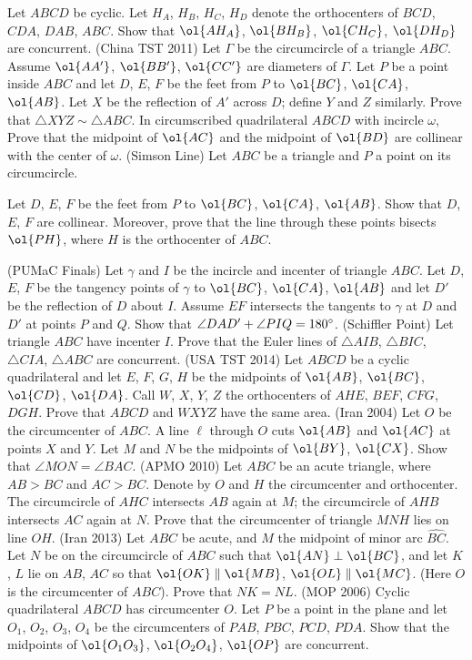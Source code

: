 \documentclass[11pt]{scrartcl}
\begin{document}
\begin{enumerate}
  \ii Let $ABCD$ be cyclic.
  Let $H_A$, $H_B$, $H_C$, $H_D$ denote the orthocenters of $BCD$, $CDA$, $DAB$, $ABC$.
  Show that $\ol{AH_A}$, $\ol{BH_B}$, $\ol{CH_C}$, $\ol{DH_D}$ are concurrent.
  \ii (China TST 2011)
  Let $\Gamma$ be the circumcircle of a triangle $ABC$.
  Assume $\ol{AA'}$, $\ol{BB'}$, $\ol{CC'}$ are diameters of $\Gamma$.
  Let $P$ be a point inside $ABC$ and let $D$, $E$, $F$ be the feet from $P$ to $\ol{BC}$, $\ol{CA}$, $\ol{AB}$.
  Let $X$ be the reflection of $A'$ across $D$; define $Y$ and $Z$ similarly.
  Prove that $\triangle XYZ \sim \triangle ABC$.
  \ii In circumscribed quadrilateral $ABCD$ with incircle $\omega$,
  Prove that the midpoint of $\ol{AC}$ and the midpoint of $\ol{BD}$ are collinear with the center of $\omega$.
  \ii (Simson Line) Let $ABC$ be a triangle and $P$ a point on its circumcircle.
  \begin{enumerate}[(a)]
    \ii Let $D$, $E$, $F$ be the feet from $P$ to $\ol{BC}$, $\ol{CA}$, $\ol{AB}$.
    Show that $D$, $E$, $F$ are collinear.
    \ii Moreover, prove that the line through these points bisects $\ol{PH}$,
    where $H$ is the orthocenter of $ABC$.
  \end{enumerate}
  \ii (PUMaC Finals) Let $\gamma$ and $I$ be the incircle and incenter of triangle $ABC$.
  Let $D$, $E$, $F$ be the tangency points of $\gamma$ to $\ol{BC}$, $\ol{CA}$, $\ol{AB}$
  and let $D'$ be the reflection of $D$ about $I$.
  Assume $EF$ intersects the tangents to $\gamma$ at $D$ and $D'$ at points $P$ and $Q$.
  Show that $\angle DAD' + \angle PIQ = 180^\circ$.
  \ii (Schiffler Point) Let triangle $ABC$ have incenter $I$.
  Prove that the Euler lines of $\triangle AIB$, $\triangle BIC$, $\triangle CIA$, $\triangle ABC$ are concurrent.
  \ii (USA TST 2014) Let $ABCD$ be a cyclic quadrilateral and let
  $E$, $F$, $G$, $H$ be the midpoints of $\ol{AB}$, $\ol{BC}$, $\ol{CD}$, $\ol{DA}$.
  Call $W$, $X$, $Y$, $Z$ the orthocenters of $AHE$, $BEF$, $CFG$, $DGH$.
  Prove that $ABCD$ and $WXYZ$ have the same area.
  \ii (Iran 2004) Let $O$ be the circumcenter of $ABC$.
  A line $\ell$ through $O$ cuts $\ol{AB}$ and $\ol{AC}$ at points $X$ and $Y$.
  Let $M$ and $N$ be the midpoints of $\ol{BY}$, $\ol{CX}$. Show that $\angle MON = \angle BAC$.
  \ii (APMO 2010) Let $ABC$ be an acute triangle, where $AB > BC$ and $AC > BC$.
  Denote by $O$ and $H$ the circumcenter and orthocenter.
  The circumcircle of $AHC$ intersects $AB$ again at $M$;
  the circumcircle of $AHB$ intersects $AC$ again at $N$.
  Prove that the circumcenter of triangle $MNH$ lies on line $OH$.
  \ii (Iran 2013) Let $ABC$ be acute, and $M$ the midpoint of minor arc $\widehat{BC}$.
  Let $N$ be on the circumcircle of $ABC$ such that $\ol{AN} \perp \ol{BC}$,
  and let $K$, $L$ lie on $AB$, $AC$ so that $\ol{OK} \parallel \ol{MB}$, $\ol{OL} \parallel \ol{MC}$.
  (Here $O$ is the circumcenter of $ABC$). Prove that $NK = NL$.
  \ii (MOP 2006) Cyclic quadrilateral $ABCD$ has circumcenter $O$.
  Let $P$ be a point in the plane
  and let $O_1$, $O_2$, $O_3$, $O_4$ be the circumcenters of $PAB$, $PBC$, $PCD$, $PDA$.
  Show that the midpoints of
  $\ol{O_1 O_3}$, $\ol{O_2O_4}$, $\ol{OP}$ are concurrent.
\end{enumerate}
\end{document}
